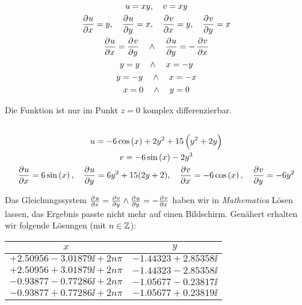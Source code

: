 \begin{gather*}
	u = xy
	,\quad
	v = xy \\
	\dpd ux = y
	,\quad
	\dpd uy = x
	,\quad
	\dpd vx = y
	,\quad
	\dpd vy = x \\
	\dpd ux = \dpd vy
	\quad\wedge\quad
	\dpd uy = - \dpd vx \\
	y = y
	\quad\wedge\quad
	x = -y \\
	y = -y
	\quad\wedge\quad
	x = -x \\
	x = 0
	\quad\wedge\quad
	y = 0
\end{gather*}

Die Funktion ist nur im Punkt $z = 0$ komplex differenzierbar.

\subsection{}

\begin{gather*}
	u = -6 \cos\del x + 2 y^2 + 15\del{y^2 + 2y} \\
	v = -6 \sin\del x - 2y^3 \\
	\dpd ux = 6 \sin\del x
	,\quad
	\dpd uy = 6 y^2 + 15(2y +2)
	,\quad
	\dpd vx = - 6 \cos\del x
	,\quad
	\dpd vy = - 6 y^2
\end{gather*}

Das Gleichungssystem $\pd ux = \pd vy \wedge \pd uy = - \pd vx$ haben wir in
\emph{Mathematica} Lösen lassen, das Ergebnis passte nicht mehr auf einen
Bildschirm. Genähert erhalten wir folgende Lösungen (mit $n \in \mathbb Z$):
\begin{center}
\begin{tabular}{cc}
	$x$ & $y$ \\
	\hline
	$+2.50956 - 3.01879 \ii + 2 n \pi$ & $-1.44323 + 2.85358 \ii$ \\
	$+2.50956 + 3.01879 \ii + 2 n \pi$ & $-1.44323 - 2.85358 \ii$ \\
	$-0.93877 - 0.77286 \ii + 2 n \pi$ & $-1.05677 - 0.23817 \ii$ \\
	$-0.93877 + 0.77286 \ii + 2 n \pi$ & $-1.05677 + 0.23819 \ii$ \\
\end{tabular}
\end{center}

\fehlt

\subsection{}

